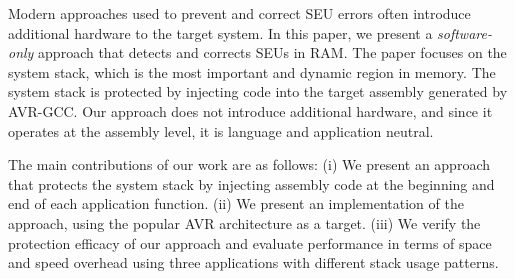 Modern approaches used to prevent and correct SEU errors often introduce additional hardware to the target system. In this paper, we present a {\em software-only} approach that detects and corrects SEUs in RAM. The paper focuses on the system stack, which is the most important and dynamic region in memory. The system stack is protected by injecting code into the target assembly generated by AVR-GCC. 
Our approach 
does not introduce additional hardware, and since it operates at the assembly level, it is language and application neutral. 

The main contributions of our work are as follows: (i) We present an approach that protects the system stack by injecting assembly code at the beginning and end of each application function. (ii) We present an implementation of the approach, using the popular AVR architecture as a target. (iii) We verify the protection efficacy of our approach and evaluate performance in terms of space and speed overhead using three applications with different stack usage patterns.

